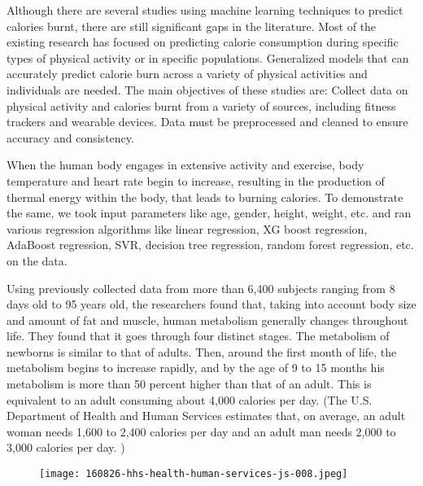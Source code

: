 \documentclass[conference]{IEEEtran}
\begin{document}
Although there are several studies using machine learning techniques to predict calories burnt, there are still significant gaps in the literature. Most of the existing research has focused on predicting calorie consumption during specific types of physical activity or in specific populations. Generalized models that can accurately predict calorie burn across a variety of physical activities and individuals are needed. The main objectives of these studies are: Collect data on physical activity and calories burnt from a variety of sources, including fitness trackers and wearable devices. Data must be preprocessed and cleaned to ensure accuracy and consistency.  \newline

When the human body engages in extensive activity and exercise, body temperature and heart rate begin to increase, resulting in the production of thermal energy within the body, that leads to burning calories. To demonstrate the same, we took input parameters like age, gender, height, weight, etc. and ran various regression algorithms like linear regression, XG boost regression, AdaBoost regression, SVR, decision tree regression, random forest regression, etc. on the data.  
\newline

Using previously collected data from more than 6,400 subjects ranging from 8 days old to 95 years old, the researchers found that, taking into account body size and amount of fat and muscle, human metabolism generally changes throughout life. They found that it goes through four distinct stages. The metabolism of newborns is similar to that of adults. Then, around the first month of life, the metabolism begins to increase rapidly, and by the age of 9 to 15 months his metabolism is more than 50 percent higher than that of an adult. This is equivalent to an adult consuming about 4,000 calories per day. (The U.S. Department of Health and Human Services estimates that, on average, an adult woman needs 1,600 to 2,400 calories per day and an adult man needs 2,000 to 3,000 calories per day. ) \newline

 \begin{figure}[H]
\texttt{[image: 160826-hhs-health-human-services-js-008.jpeg]}
\end{figure}
\end{document}
